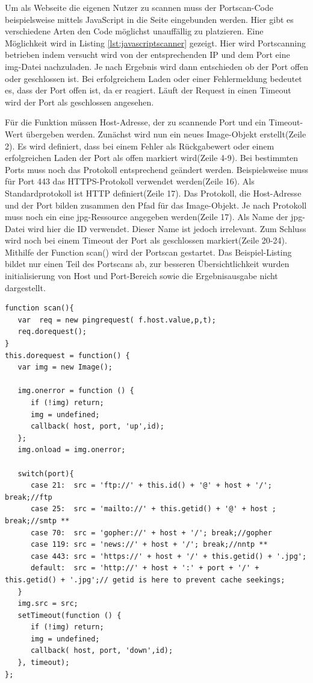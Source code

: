 Um als Webseite die eigenen Nutzer zu scannen muss der Portscan-Code beispielsweise mittels JavaScript in die Seite eingebunden werden. Hier gibt es verschiedene Arten den Code möglichst unauffällig zu platzieren. Eine Möglichkeit wird in Listing \ref{lst:javascriptscanner} gezeigt. Hier wird Portscanning betrieben indem versucht wird von der entsprechenden IP und dem Port eine img-Datei nachzuladen. Je nach Ergebnis wird dann entschieden ob der Port offen oder geschlossen ist. Bei erfolgreichem Laden oder einer Fehlermeldung bedeutet es, dass der Port offen ist, da er reagiert. Läuft der Request in einen Timeout wird der Port als geschlossen angesehen.

Für die Funktion müssen Host-Adresse, der zu scannende Port und ein Timeout-Wert übergeben werden. Zunächst wird nun ein neues Image-Objekt erstellt(Zeile 2). Es wird definiert, dass bei einem Fehler als Rückgabewert oder einem erfolgreichen Laden der Port als offen markiert wird(Zeile 4-9). Bei bestimmten Ports muss noch das Protokoll entsprechend geändert werden. Beispielsweise muss für Port 443 das HTTPS-Protokoll verwendet werden(Zeile 16). Als Standardprotokoll ist HTTP definiert(Zeile 17). Das Protokoll, die Host-Adresse und der Port bilden zusammen den Pfad für das Image-Objekt. Je nach Protokoll muss noch ein eine jpg-Ressource angegeben werden(Zeile 17). Als Name der jpg-Datei wird hier die ID verwendet. Dieser Name ist jedoch irrelevant. Zum Schluss wird noch bei einem Timeout der Port als geschlossen markiert(Zeile 20-24). Mithilfe der Function scan() wird der Portscan gestartet. Das Beispiel-Listing bildet nur einen Teil des Portscans ab, zur besseren Übersichtlichkeit wurden initialisierung von Host und Port-Bereich sowie die Ergebnisausgabe nicht dargestellt.

\begin{scriptsize}
\begin{lstlisting}
function scan(){
   var  req = new pingrequest( f.host.value,p,t);
   req.dorequest();
}
this.dorequest = function() {
   var img = new Image();

   img.onerror = function () {
      if (!img) return;
      img = undefined;
      callback( host, port, 'up',id);
   };
   img.onload = img.onerror;

   switch(port){
      case 21:  src = 'ftp://' + this.id() + '@' + host + '/'; break;//ftp
      case 25:  src = 'mailto://' + this.getid() + '@' + host ; break;//smtp **
      case 70:  src = 'gopher://' + host + '/'; break;//gopher
      case 119: src = 'news://' + host + '/'; break;//nntp **
      case 443: src = 'https://' + host + '/' + this.getid() + '.jpg';
      default:  src = 'http://' + host + ':' + port + '/' + this.getid() + '.jpg';// getid is here to prevent cache seekings;
   }
   img.src = src;
   setTimeout(function () {
      if (!img) return;
      img = undefined;
      callback( host, port, 'down',id);
   }, timeout);
};
\end{lstlisting}
\end{scriptsize}

